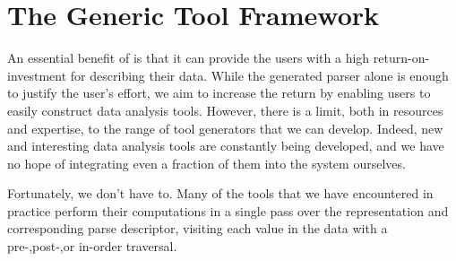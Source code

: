 \section{The Generic Tool Framework}
\label{sec:gen-tool}


An essential benefit of \padsml{} is that it can provide the users
with a high return-on-investment for describing their data. While the
generated parser alone is enough to justify the user's effort, we aim
to increase the return by enabling users to easily construct data
analysis tools. However, there is a limit, both in resources and
expertise, to the range of tool generators that we can develop.
Indeed, new and interesting data analysis tools are constantly being
developed, and we have no hope of integrating even a fraction of them
into the \padsml{} system ourselves.

Fortunately, we don't have to. Many of the tools that we have
encountered in practice perform their computations in a single pass
over the representation and corresponding parse descriptor, visiting
each value in the data with a pre-,post-,or in-order traversal.


